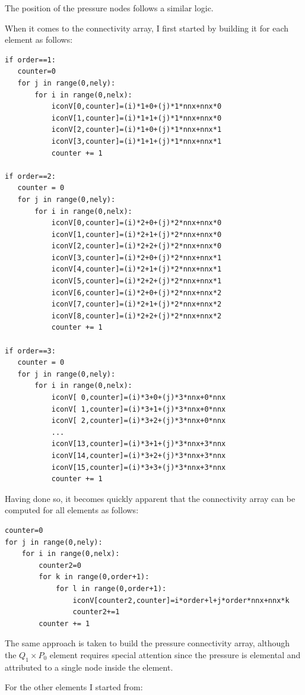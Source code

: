 The position of the pressure nodes follows a similar logic.

When it comes to the connectivity array, I first started by building it 
for each element as follows:

\begin{lstlisting}
if order==1:
   counter=0
   for j in range(0,nely):
       for i in range(0,nelx):
           iconV[0,counter]=(i)*1+0+(j)*1*nnx+nnx*0 
           iconV[1,counter]=(i)*1+1+(j)*1*nnx+nnx*0 
           iconV[2,counter]=(i)*1+0+(j)*1*nnx+nnx*1 
           iconV[3,counter]=(i)*1+1+(j)*1*nnx+nnx*1 
           counter += 1

if order==2:
   counter = 0
   for j in range(0,nely):
       for i in range(0,nelx):
           iconV[0,counter]=(i)*2+0+(j)*2*nnx+nnx*0 
           iconV[1,counter]=(i)*2+1+(j)*2*nnx+nnx*0 
           iconV[2,counter]=(i)*2+2+(j)*2*nnx+nnx*0 
           iconV[3,counter]=(i)*2+0+(j)*2*nnx+nnx*1 
           iconV[4,counter]=(i)*2+1+(j)*2*nnx+nnx*1 
           iconV[5,counter]=(i)*2+2+(j)*2*nnx+nnx*1 
           iconV[6,counter]=(i)*2+0+(j)*2*nnx+nnx*2 
           iconV[7,counter]=(i)*2+1+(j)*2*nnx+nnx*2
           iconV[8,counter]=(i)*2+2+(j)*2*nnx+nnx*2 
           counter += 1

if order==3:
   counter = 0
   for j in range(0,nely):
       for i in range(0,nelx):
           iconV[ 0,counter]=(i)*3+0+(j)*3*nnx+0*nnx 
           iconV[ 1,counter]=(i)*3+1+(j)*3*nnx+0*nnx 
           iconV[ 2,counter]=(i)*3+2+(j)*3*nnx+0*nnx 
           ...
           iconV[13,counter]=(i)*3+1+(j)*3*nnx+3*nnx 
           iconV[14,counter]=(i)*3+2+(j)*3*nnx+3*nnx 
           iconV[15,counter]=(i)*3+3+(j)*3*nnx+3*nnx 
           counter += 1
\end{lstlisting}
Having done so, it becomes quickly apparent that the connectivity array 
can be computed for all elements as follows:
\begin{lstlisting}
counter=0
for j in range(0,nely):
    for i in range(0,nelx):
        counter2=0
        for k in range(0,order+1):
            for l in range(0,order+1):
                iconV[counter2,counter]=i*order+l+j*order*nnx+nnx*k
                counter2+=1
        counter += 1
\end{lstlisting}
The same approach is taken to build the pressure connectivity array, 
although the $Q_1\times P_0$ element requires special attention since
the pressure is elemental and attributed to a single node inside the element. 

For the other elements I started from:

